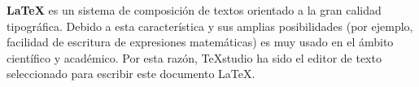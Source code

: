 \textbf{LaTeX} es un sistema de composición de textos orientado a la gran calidad tipográfica. Debido a esta característica y sus amplias posibilidades (por ejemplo, facilidad de escritura de expresiones matemáticas) es muy usado en el ámbito científico y académico. Por esta razón,  TeXstudio \cite{TexstudioInicial} ha sido el editor de texto seleccionado para escribir este documento LaTeX.



